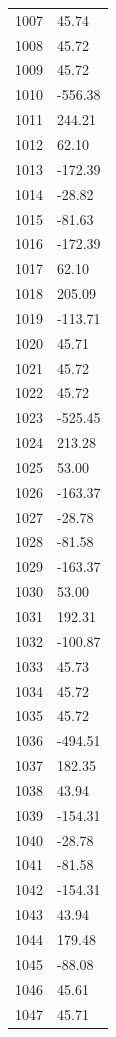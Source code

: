 \documentclass[a4paper,11pt]{article}
\begin{document}
\begin{center}
\begin{longtable}{|R{1.5cm}|R{2.5cm}|}
 1007 &        45.74 \\
 1008 &        45.72 \\
 1009 &        45.72 \\
 1010 &      -556.38 \\
 1011 &       244.21 \\
 1012 &        62.10 \\
 1013 &      -172.39 \\
 1014 &       -28.82 \\
 1015 &       -81.63 \\
 1016 &      -172.39 \\
 1017 &        62.10 \\
 1018 &       205.09 \\
 1019 &      -113.71 \\
 1020 &        45.71 \\
 1021 &        45.72 \\
 1022 &        45.72 \\
 1023 &      -525.45 \\
 1024 &       213.28 \\
 1025 &        53.00 \\
 1026 &      -163.37 \\
 1027 &       -28.78 \\
 1028 &       -81.58 \\
 1029 &      -163.37 \\
 1030 &        53.00 \\
 1031 &       192.31 \\
 1032 &      -100.87 \\
 1033 &        45.73 \\
 1034 &        45.72 \\
 1035 &        45.72 \\
 1036 &      -494.51 \\
 1037 &       182.35 \\
 1038 &        43.94 \\
 1039 &      -154.31 \\
 1040 &       -28.78 \\
 1041 &       -81.58 \\
 1042 &      -154.31 \\
 1043 &        43.94 \\
 1044 &       179.48 \\
 1045 &       -88.08 \\
 1046 &        45.61 \\
 1047 &        45.71 \\

\end{longtable}
\end{center}
\end{document}
